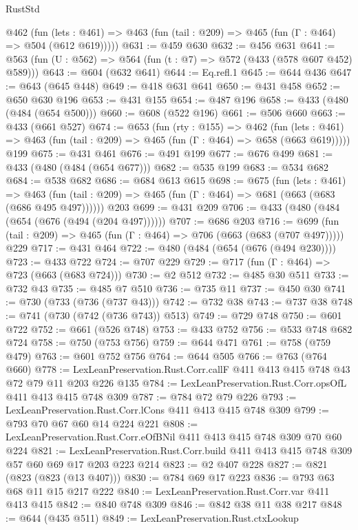 \begin{lexlean}{RustStd}
\begin{coremodule}
    @462
      (fun (lets : @461) => @463 (fun (tail : @209) => @465 (fun (Γ : @464) => @504 (@612 @619)))))
@631 := @459 @630
@632 := @456 @631
@641 := @563 (fun (U : @562) => @564 (fun (t : @7) => @572 (@433 (@578 @607 @452) @589)))
@643 := @604 (@632 @641)
@644 := Eq.refl.{1}
@645 := @644 @436
@647 := @643 (@645 @448)
@649 := @418 @631 @641
@650 := @431 @458
@652 := @650 @630 @196
@653 := @431 @155
@654 := @487 @196
@658 := @433 (@480 (@484 (@654 @500)))
@660 := @608 (@522 @196)
@661 := @506 @660
@663 := @433 (@661 @527)
@674 := @653
    (fun (rty : @155) =>
    @462
      (fun (lets : @461) => @463 (fun (tail : @209) => @465 (fun (Γ : @464) => @658 (@663 @619)))))
    @199
@675 := @431 @461
@676 := @491 @199
@677 := @676 @499
@681 := @433 (@480 (@484 (@654 @677)))
@682 := @535 @199
@683 := @534 @682
@684 := @538 @682
@686 := @684 @613 @615
@698 := @675
    (fun (lets : @461) =>
    @463 (fun (tail : @209) => @465 (fun (Γ : @464) => @681 (@663 (@683 (@686 @495 @497))))))
    @203
@699 := @431 @209
@706 := @433 (@480 (@484 (@654 (@676 (@494 (@204 @497))))))
@707 := @686 @203
@716 := @699 (fun (tail : @209) => @465 (fun (Γ : @464) => @706 (@663 (@683 (@707 @497))))) @229
@717 := @431 @464
@722 := @480 (@484 (@654 (@676 (@494 @230))))
@723 := @433 @722
@724 := @707 @229
@729 := @717 (fun (Γ : @464) => @723 (@663 (@683 @724)))
@730 := @2 @512
@732 := @485 @30 @511
@733 := @732 @43
@735 := @485 @7 @510
@736 := @735 @11
@737 := @450 @30
@741 := @730 (@733 (@736 (@737 @43)))
@742 := @732 @38
@743 := @737 @38
@748 := @741 (@730 (@742 (@736 @743)) @513)
@749 := @729 @748
@750 := @601 @722
@752 := @661 (@526 @748)
@753 := @433 @752
@756 := @533 @748 @682 @724
@758 := @750 (@753 @756)
@759 := @644 @471
@761 := @758 (@759 @479)
@763 := @601 @752 @756
@764 := @644 @505
@766 := @763 (@764 @660)
@778 := LexLeanPreservation.Rust.Corr.callF @411 @413 @415 @748 @43 @72 @79 @11 @203 @226 @135
@784 := LexLeanPreservation.Rust.Corr.opsOfL @411 @413 @415 @748 @309
@787 := @784 @72 @79 @226
@793 := LexLeanPreservation.Rust.Corr.lCons @411 @413 @415 @748 @309
@799 := @793 @70 @67 @60 @14 @224 @221
@808 := LexLeanPreservation.Rust.Corr.eOfBNil @411 @413 @415 @748 @309 @70 @60 @224
@821 := LexLeanPreservation.Rust.Corr.build @411 @413 @415 @748 @309 @57 @60 @69 @17 @203 @223 @214
@823 := @2 @407 @228
@827 := @821 (@823 (@823 (@13 @407)))
@830 := @784 @69 @17 @223
@836 := @793 @63 @68 @11 @15 @217 @222
@840 := LexLeanPreservation.Rust.Corr.var @411 @413 @415
@842 := @840 @748 @309
@846 := @842 @38 @11 @38 @217
@848 := @644 (@435 @511)
@849 := LexLeanPreservation.Rust.ctxLookup

\end{coremodule}
\end{lexlean}
